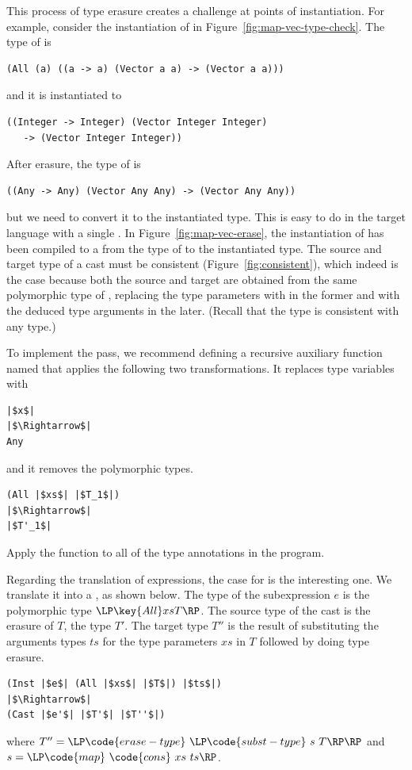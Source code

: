 \documentclass[11pt]{book}
\begin{document}
This process of type erasure creates a challenge at points of
instantiation. For example, consider the instantiation of
 in Figure~\ref{fig:map-vec-type-check}.
The type of  is
\begin{lstlisting}
(All (a) ((a -> a) (Vector a a) -> (Vector a a)))
\end{lstlisting}
and it is instantiated to 
\begin{lstlisting}
((Integer -> Integer) (Vector Integer Integer)
   -> (Vector Integer Integer))
\end{lstlisting}
After erasure, the type of  is
\begin{lstlisting}
((Any -> Any) (Vector Any Any) -> (Vector Any Any))
\end{lstlisting}
but we need to convert it to the instantiated type.  This is easy to
do in the target language \LangCast{} with a single .  In
Figure~\ref{fig:map-vec-erase}, the instantiation of 
has been compiled to a  from the type of  to
the instantiated type. The source and target type of a cast must be
consistent (Figure~\ref{fig:consistent}), which indeed is the case
because both the source and target are obtained from the same
polymorphic type of , replacing the type parameters with
 in the former and with the deduced type arguments in the
later. (Recall that the  type is consistent with any type.)

To implement the  pass, we recommend defining a
recursive auxiliary function named  that applies the
following two transformations. It replaces type variables with
\begin{lstlisting}
|$x$|
|$\Rightarrow$|
Any
\end{lstlisting}
and it removes the polymorphic  types.
\begin{lstlisting}
(All |$xs$| |$T_1$|)
|$\Rightarrow$|
|$T'_1$|
\end{lstlisting}
Apply the  function to all of the type annotations in
the program.

Regarding the translation of expressions, the case for  is
the interesting one. We translate it into a , as shown
below. The type of the subexpression $e$ is the polymorphic type
$\LP\key{All} xs T\RP$. The source type of the cast is the erasure of
$T$, the type $T'$. The target type $T''$ is the result of
substituting the arguments types $ts$ for the type parameters $xs$ in
$T$ followed by doing type erasure.
\begin{lstlisting}
(Inst |$e$| (All |$xs$| |$T$|) |$ts$|)
|$\Rightarrow$|
(Cast |$e'$| |$T'$| |$T''$|)
\end{lstlisting}
where $T'' = \LP\code{erase-type}~\LP\code{subst-type}~s~T\RP\RP$
and $s = \LP\code{map}~\code{cons}~xs~ts\RP$.
\end{document}
